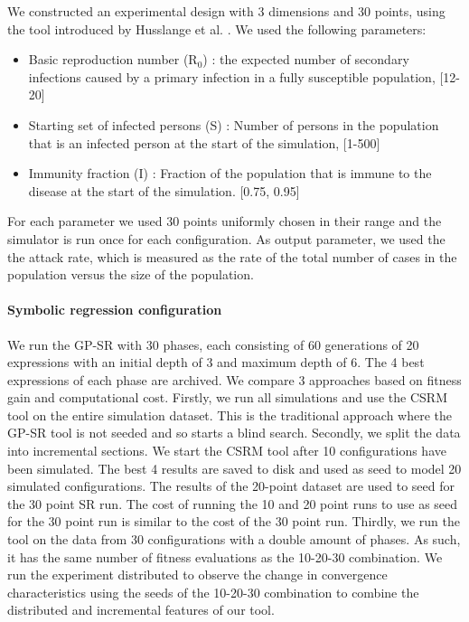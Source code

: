 We constructed an experimental design with 3 dimensions and 30 points, using the tool introduced by Husslange et al. \citep{DOE}. We used the following parameters:
\begin{itemize}
\item Basic reproduction number (R$_0$) : the expected number of secondary infections caused by a primary infection in a fully susceptible population, [12-20]
\item Starting set of infected persons (S) : Number of persons in the population that is an infected person at the start of the simulation, [1-500]
\item Immunity fraction (I) : Fraction of the population that is immune to the disease at the start of the simulation. [0.75, 0.95]
\end{itemize}
For each parameter we used 30 points uniformly chosen in their range and the simulator is run once for each configuration. 
As output parameter, we used the the attack rate, which is measured as the rate of the total number of cases in the population versus the size of the population. 



\paragraph{Symbolic regression configuration}
We run the GP-SR with 30 phases, each consisting of 60 generations of 20 expressions with an initial depth of 3 and maximum depth of 6. The 4 best expressions of each phase are archived.
We compare 3 approaches based on fitness gain and computational cost. Firstly, we run all simulations and use the CSRM tool on the entire simulation dataset. This is the traditional approach where the GP-SR tool is not seeded and so starts a blind search. 
Secondly, we split the data into incremental sections. We start the CSRM tool after 10 configurations have been simulated. The best 4 results are saved to disk and used as seed to model 20 simulated configurations. The results of the 20-point dataset are used to seed for the 30 point SR run. The cost of running the 10 and 20 point runs to use as seed for the 30 point run is similar to the cost of the 30 point run. 
Thirdly, we run the tool on the data from 30 configurations with a double amount of phases. As such, it has the same number of fitness evaluations as the 10-20-30 combination. 
We run the experiment distributed to observe the change in convergence characteristics using the seeds of the 10-20-30 combination to combine the distributed and incremental features of our tool. %

